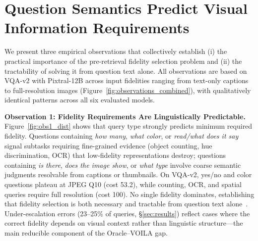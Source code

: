 
\section{Question Semantics Predict Visual Information Requirements}\label{sec:background}\label{sec:emp_insights}


We present three empirical observations that collectively establish (i) the practical importance of the pre-retrieval fidelity selection problem and (ii) the tractability of solving it from question text alone.
All observations are based on VQA-v2 with Pixtral-12B across input fidelities ranging from text-only captions to full-resolution images (Figure~\ref{fig:observations_combined}), with qualitatively identical patterns across all six evaluated models.

\textbf{Observation 1: Fidelity Requirements Are Linguistically Predictable.}
Figure~\ref{fig:obs1_dist} shows that query type strongly predicts minimum required fidelity.
Questions containing \emph{how many}, \emph{what color}, or \emph{read/what does it say} signal subtasks requiring fine-grained evidence (object counting, hue discrimination, OCR) that low-fidelity representations destroy; questions containing \emph{is there}, \emph{does the image show}, or \emph{what type} involve coarse semantic judgments resolvable from captions or thumbnails.
On VQA-v2, yes/no and color questions plateau at JPEG Q10 (cost 53.2), while counting, OCR, and spatial queries require full resolution (cost 100).
No single fidelity dominates, establishing that fidelity selection is both necessary and tractable from question text alone~\cite{kafle2017analysis,agrawal2018dont}.
Under-escalation errors (23--25\% of queries, \S\ref{sec:results}) reflect cases where the correct fidelity depends on visual context rather than linguistic structure---the main reducible component of the Oracle--\textsc{VOILA} gap.


